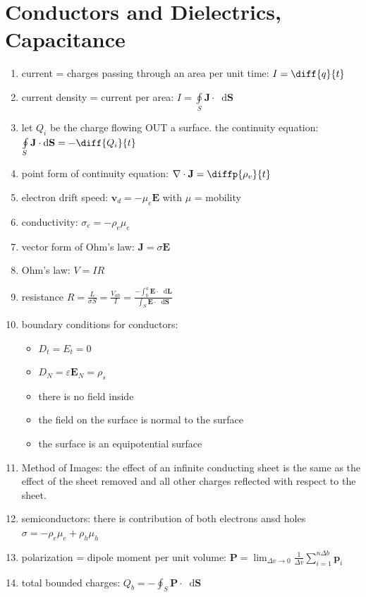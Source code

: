 \documentclass[a4paper,11pt]{article}
\newcommand*\dd{\mathop{}\!\mathrm{d}}
\newcommand{\divr}{\nabla \cdot}
\newcommand{\bvec}[1]{\mathbf{#1}}
\begin{document}
	\section{Conductors and Dielectrics, Capacitance}
	\begin{enumerate}
		\item current = charges passing through an area per unit time: $I = \diff{q}{t}$ 
		\item current density = current per area: $I = \oint\limits_{S} \bvec{J} \cdot \dd \bvec{S}$
		\item let $Q_i$ be the charge flowing OUT a surface. the continuity equation: $\oint\limits_S \bvec{J}\cdot\dd\bvec{S} = -\diff{Q_i}{t}$
		\item point form of continuity equation: $\divr \bvec{J} = \diffp{\rho_v}{t}$
		\item electron drift speed: $\bvec{v}_d = -\mu_e\bvec{E}$ with $\mu$ = mobility 
		\item conductivity: $\sigma_e = -\rho_e\mu_e$
		\item vector form of Ohm's law: $\bvec{J} = \sigma\bvec{E}$
		\item Ohm's law: $V = IR$ 
		\item resistance $R = \frac{L}{\sigma S} = \frac{V_{ab}}{I} = \frac{-\int_b^a \bvec{E} \cdot\dd\bvec{L}}{\int_{S} \bvec{E} \cdot \dd\bvec{S}}$
		\item boundary conditions for conductors:
			\begin{itemize}
				\item $D_t = E_t = 0$
				\item $D_N = \varepsilon\bvec{E}_N = \rho_s$
				\item there is no field inside
				\item the field on the surface is normal to the surface
				\item the surface is an equipotential surface
			\end{itemize}
		\item Method of Images: the effect of an infinite conducting sheet is the same as the effect of the sheet removed and all other charges reflected with respect to the sheet.
		\item semiconductors: there is contribution of both electrons ansd holes $\sigma = -\rho_e\mu_e + \rho_h\mu_h$ 
		\item polarization = dipole moment per unit volume: $\bvec{P} = \lim_{\Delta v \to 0} \frac{1}{\Delta v} \sum_{i = 1}^{n\Delta b} \bvec{p}_i$
		\item total bounded charges: $Q_b = -\oint_S \bvec{P} \cdot \dd \bvec{S}$

\end{enumerate}
\end{document}
